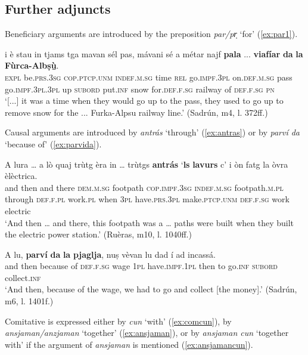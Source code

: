 \subsection{Further adjuncts}

Beneficiary arguments are introduced by the preposition \textit{par/pr̩} `for' (\ref{ex:par1}).

\ea
\label{ex:par1}
\gll   [...] i è stau in tjams tga mavan sél pas, mávani sé a métar najf \textbf{pala} ... \textbf{viafíar} \textbf{da} \textbf{la} \textbf{Fùrca-Albṣù̱}. \\
{} \textsc{expl} be.\textsc{prs.3sg} \textsc{cop.ptcp.unm} \textsc{indef.m.sg} time \textsc{rel} go.\textsc{impf.3pl} on.\textsc{def.m.sg} pass go.\textsc{impf.3pl.3pl} up \textsc{subord} put.\textsc{inf} snow for.\textsc{def.f.sg} {} railway of \textsc{def.f.sg} \textsc{pn}\\
\glt `[...] it was a time when they would go up to the pass, they used to go up to remove snow for the ... Furka-Alpsu railway line.' (Sadrún, m4, l. 372ff.)
\z

Causal arguments are introduced by \textit{antrás} `through' (\ref{ex:antras}) or by \textit{parví da} `because of' (\ref{ex:parvida}).

\ea
\label{ex:antras}
\gll A lura … a lò quaj trùtg èra in … trùtgs \textbf{antrás} `\textbf{ls} \textbf{lavurs} c' i òn fatg la òvra èlèctrica.\\
and then {}  and there \textsc{dem.m.sg} footpath  \textsc{cop.impf.3sg} \textsc{indef.m.sg} {} footpath.\textsc{m.pl} through \textsc{def.f.pl}  work.\textsc{pl} when \textsc{3pl} have.\textsc{prs.3pl} make.\textsc{ptcp.unm} \textsc{def.f.sg} work electric \\
\glt `And then … and there, this footpath was a … paths were built when they built the electric power station.' (Ruèras, m10, l. 1040ff.)
\z

\ea
\label{ex:parvida}
\gll    A lu, \textbf{parví} \textbf{da} \textbf{la} \textbf{pjaglja}, nuṣ vèvan lu dad í ad incassá.\\
and then because of \textsc{def.f.sg} wage \textsc{1pl} have.\textsc{impf.1pl} then to go.\textsc{inf}  \textsc{subord} collect.\textsc{inf} \\
\glt `And then, because of the wage, we had to go and collect [the money].' (Sadrún, m6, l. 1401f.)
\z

Comitative is expressed either by \textit{cun} `with' (\ref{ex:comcun}), by \textit{ansjaman/anzjaman} `together' (\ref{ex:ansjaman}), or by \textit{ansjaman cun} `together with' if the argument of \textit{ansjaman} is mentioned (\ref{ex:ansjamancun}).

